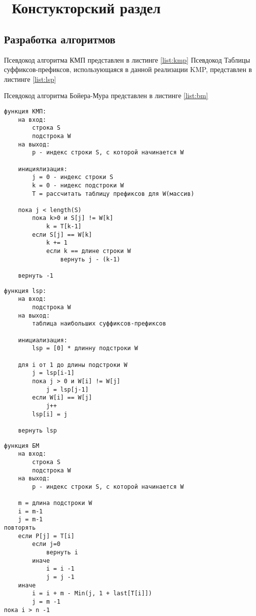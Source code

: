 \chapter{ Констукторский раздел}
\label{cha:design}
\section{ Разработка алгоритмов}

Псевдокод алгоритма КМП представлен в листинге \ref{list:kmp}
Псевдокод Таблицы суффиксов-префиксов, использующаяся в данной реализации KMP, представлен в листинге \ref{list:lsp}

Псевдокод алгоритма Бойера-Мура представлен в листинге \ref{list:bm}

\begin{lstlisting}[caption={Псевдокод алгоритма КМП}, label={list:kmp}]
функция КМП:
    на вход:
        строка S
        подстрока W
    на выход:
        p - индекс строки S, с которой начинается W

    инициялизация:
        j = 0 - индекс строки S
        k = 0 - нидекс подстроки W
        T = рассчитать таблицу префиксов для W(массив)

    пока j < length(S)
        пока k>0 и S[j] != W[k]
            k = T[k-1]
        если S[j] == W[k]
            k += 1
            если k == длине строки W
                вернуть j - (k-1)

    вернуть -1
\end{lstlisting}

\begin{lstlisting}[caption={Псевдокод создания таблицы префиксов для подстроки}, label={list:lsp}]
функция lsp:
    на вход:
        подстрока W
    на выход:
        таблица наибольших суффиксов-префиксов 

    инициализация:
        lsp = [0] * длинну подстроки W

    для i от 1 до длины подстроки W
        j = lsp[i-1]
        пока j > 0 и W[i] != W[j]
            j = lsp[j-1]
        если W[i] == W[j]
            j++
        lsp[i] = j

    вернуть lsp
\end{lstlisting}

\begin{lstlisting}[caption={ Псевдокод алгоритма Бойера-Мура}, label={list:bm}]
функция БМ
    на вход:
        строка S
        подстрока W
    на выход:
        p - индекс строки S, с которой начинается W
    
    m = длина подстроки W
    i = m-1
    j = m-1
повторять
    если P[j] = T[i]
        если j=0
            вернуть i
        иначе 
            i = i -1
            j = j -1
    иначе
        i = i + m - Min(j, 1 + last[T[i]])
        j = m -1
пока i > n -1
\end{lstlisting}
